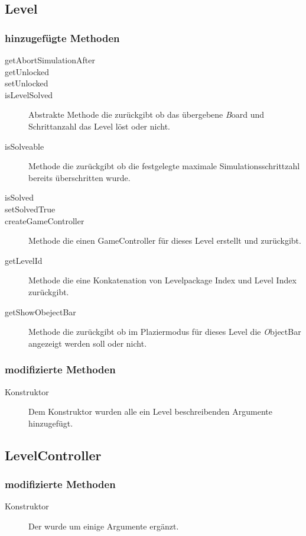 \subsection{Level}

	\subsubsection{hinzugefügte Methoden}
		\begin{description}
			\item[getAbortSimulationAfter]
			\item[getUnlocked]
			\item[setUnlocked]
			\item[isLevelSolved] Abstrakte Methode die zurückgibt ob das übergebene \emph Board und Schrittanzahl das 
				Level löst oder nicht.
			\item[isSolveable] Methode die zurückgibt ob die festgelegte maximale Simulationsschrittzahl bereits 
				überschritten wurde.
			\item[isSolved]
			\item[setSolvedTrue]
			\item[createGameController] Methode die einen GameController für dieses Level erstellt und zurückgibt.
			\item[getLevelId] Methode die eine Konkatenation von Levelpackage Index und Level Index zurückgibt.
			\item[getShowObejectBar] Methode die zurückgibt ob im Plaziermodus für dieses Level die \emph ObjectBar 
				angezeigt werden soll oder nicht.
		\end{description}
	\subsubsection{modifizierte Methoden}
		\begin{description}
			\item[Konstruktor] Dem Konstruktor wurden alle ein Level beschreibenden Argumente hinzugefügt.
		\end{description}

\subsection{LevelController}

	\subsubsection{modifizierte Methoden}
		\begin{description}
			\item[Konstruktor] Der wurde um einige Argumente ergänzt.
		\end{description}
